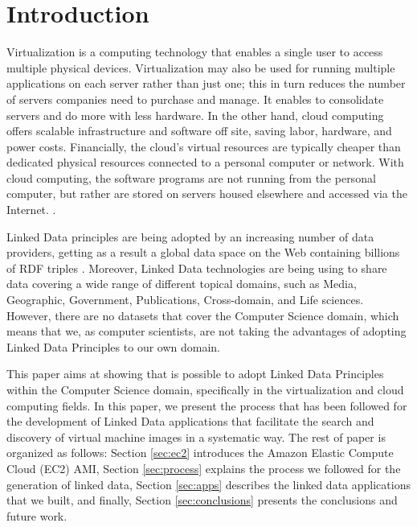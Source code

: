 \section{Introduction}\label{sec:intro}
Virtualization is a computing technology that enables a single user to access multiple physical devices. Virtualization may also be used for running multiple applications on each server rather than just one; this in turn reduces the number of servers companies need to purchase and manage. It enables to consolidate servers and do more with less hardware. In the other hand, cloud computing offers scalable infrastructure and software off site, saving labor, hardware, and power costs. Financially, the cloud’s virtual resources are typically cheaper than dedicated physical resources connected to a personal computer or network. With cloud computing, the software programs are not running from the personal computer, but rather are stored on servers housed elsewhere and accessed via the Internet. \cite{Steinder_2008}.

Linked Data principles are being adopted by an increasing number of data providers, getting as a result a global data space on the Web containing billions of RDF triples \cite{Heath_Bizer_2011}. Moreover, Linked Data technologies are being using to share data covering a wide range of different topical domains, such as Media, Geographic, Government, Publications, Cross-domain, and Life sciences. However, there are no datasets that cover the Computer Science domain, which means that we, as computer scientists, are not taking the advantages of adopting Linked Data Principles to our own domain.

This paper aims at showing that is possible to adopt Linked Data Principles within the Computer Science domain, specifically in the virtualization and cloud computing fields. In this paper, we present the process that has been followed for the development of Linked Data applications that facilitate the search and discovery of virtual machine images in a systematic way. The rest of paper is organized as follows: Section \ref{sec:ec2} introduces the Amazon Elastic Compute Cloud (EC2) AMI, Section \ref{sec:process} explains the process we followed for the generation of linked
data, Section \ref{sec:apps} describes the linked data applications that we built, and finally, Section \ref{sec:conclusions} presents the conclusions and future work.







